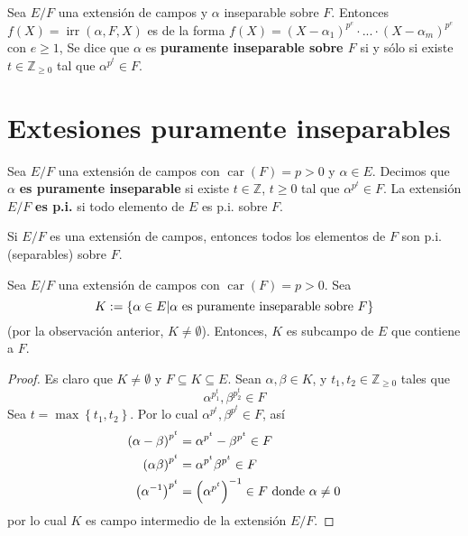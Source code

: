 \documentclass[12pt]{report}
\theoremstyle{largebreak}
\DeclareMathOperator{\car}{car}
\DeclareMathOperator{\irr}{irr}
\begin{document}
    \begin{mydef}
        Sea $E/F$ una extensión de campos y $\alpha$ inseparable sobre $F$. Entonces $f(X)=\irr(\alpha,F,X)$ es de la forma $f(X)=\left(X-\alpha_1\right)^{p^e}\cdot...\cdot\left(X-\alpha_m\right)^{p^e}$ con $e\geq1$, Se dice que $\alpha$ es \textbf{puramente inseparable sobre $F$} si y sólo si existe $t\in\mathbb{Z}_{\geq0}$ tal que $\alpha^{p^t}\in F$.
    \end{mydef}

    \section{Extesiones puramente inseparables}

    \begin{mydef}
        Sea $E/F$ una extensión de campos con $\car(F)=p>0$ y $\alpha\in E$. Decimos que $\alpha$ \textbf{es puramente inseparable} si existe $t\in \mathbb{Z}$, $t\geq 0$ tal que $\alpha^{p^t}\in F$.
        La extensión $E/F$ \textbf{es p.i.} si todo elemento de $E$ es p.i. sobre $F$.
    \end{mydef}

    \begin{obs}
        Si $E/F$ es una extensión de campos, entonces todos los elementos de $F$ son p.i. (separables) sobre $F$. 
    \end{obs}

    \begin{propo}
        Sea $E/F$ una extensión de campos con $\car(F)=p>0$. Sea
        \begin{equation*}
            K:=\left\{\alpha\in E|\alpha\textup{ es puramente inseparable sobre }F\right\}
        \end{equation*}
        (por la observación anterior, $K\neq \emptyset$). Entonces, $K$ es subcampo de $E$ que contiene a $F$.
    \end{propo}

    \begin{proof}
        Es claro que $K\neq \emptyset$ y $F\subseteq K \subseteq E$. Sean $\alpha, \beta\in K$, y $t_1,t_2\in \mathbb{Z}_{\geq0}$ tales que
        \begin{equation*}
            \alpha^{p^t_1},\beta^{p^t_2}\in F
        \end{equation*}
        Sea $t=\max\left\{t_1,t_2\right\}$. Por lo cual $\alpha^{p^t},\beta^{p^t}\in F$, así
        \begin{equation*}
            \begin{split}
                \left(\alpha-\beta\right)^{p^t}&=\alpha^{p^t}-\beta^{p^t}\in F\\
                \left(\alpha\beta\right)^{p^t}&=\alpha^{p^t}\beta^{p^t}\in F\\
                \left(\alpha^{-1}\right)^{p^t}&=\left(\alpha^{p^t}\right)^{-1}\in F\textup{ donde $\alpha\neq0$}
            \end{split}
        \end{equation*}
        por lo cual $K$ es campo intermedio de la extensión $E/F$.
    \end{proof}
\end{document}
